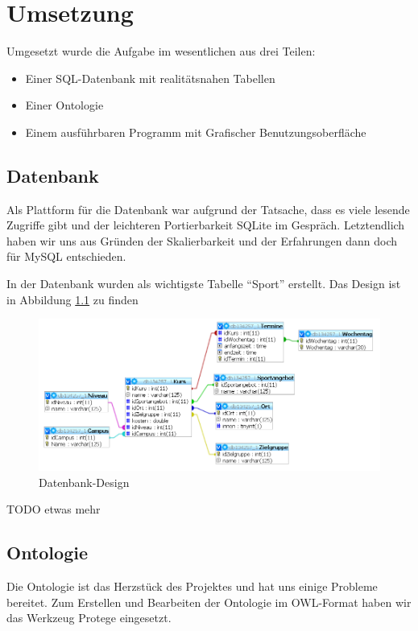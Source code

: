 \chapter{Umsetzung}

Umgesetzt wurde die Aufgabe im wesentlichen aus drei Teilen: 
\begin{itemize}
	\item Einer SQL-Datenbank mit realitätsnahen Tabellen 
	\item Einer Ontologie 
	\item Einem ausführbaren Programm mit Grafischer Benutzungsoberfläche

\end{itemize}

\section{Datenbank}

Als Plattform für die Datenbank war aufgrund der Tatsache, dass es viele lesende Zugriffe gibt und der leichteren Portierbarkeit SQLite im Gespräch. Letztendlich haben wir uns aus Gründen der Skalierbarkeit und der Erfahrungen dann doch für MySQL entschieden.

In der Datenbank wurden als wichtigste Tabelle "`Sport"' erstellt. Das Design ist in Abbildung \ref{dbd} zu finden


\begin{figure}%
\includegraphics[width=150mm]{images/db_design}
\caption{Datenbank-Design}%
\label{dbd}%
\end{figure}

TODO etwas mehr

\section{Ontologie}
Die Ontologie ist das Herzstück des Projektes und hat uns einige Probleme bereitet. Zum Erstellen und Bearbeiten der Ontologie im OWL-Format haben wir das Werkzeug Protege eingesetzt.

